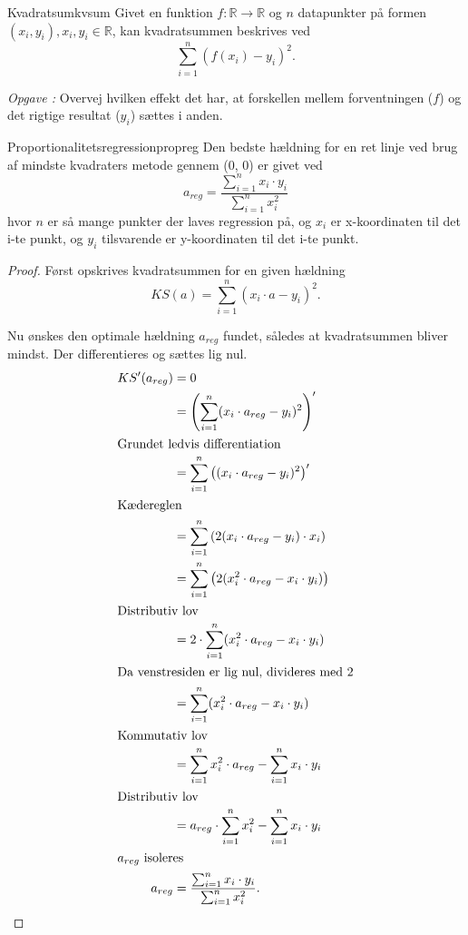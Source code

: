 \documentclass{article}
\newcounter{opgavecnt}
\newcommand{\opg}[1]{\stepcounter{opgavecnt}\textit{Opgave \arabic{opgavecnt}: }#1}
\begin{document}
\begin{definition}{Kvadratsum}{kvsum}
	Givet en funktion $f: \mathbb{R} \to \mathbb{R}$ og $n$ datapunkter på formen
	$(x_i, y_i), x_i, y_i \in \mathbb{R}$, kan kvadratsummen beskrives ved
	\[
		\sum_{i=1}^n (f(x_i) - y_i)^2.
	\] 
\end{definition}

\opg{Overvej hvilken effekt det har, at forskellen mellem forventningen ($f$)
og det rigtige resultat ($y_i$) sættes i anden.}

\begin{theorem}{Proportionalitetsregression}{propreg}
	Den bedste hældning for en ret linje ved brug af mindste kvadraters metode
	gennem (0, 0) er givet ved
	\[
	    a_{reg} = \frac{\sum_{i=1}^n x_i \cdot y_i}{\sum_{i=1}^n x_i^2}
	\] 
	hvor $n$ er så mange punkter der laves regression på, og $x_i$ er x-koordinaten
	til det i-te punkt, og $y_i$ tilsvarende er y-koordinaten til det i-te punkt.
\end{theorem}

\begin{proof}
Først opskrives kvadratsummen for en given hældning
\[
	KS(a) = \sum_{i=1}^n (x_i \cdot a - y_i)^2.
\] 

Nu ønskes den optimale hældning $a_{reg}$ fundet, således at kvadratsummen bliver
mindst. Der differentieres og sættes lig nul.
\begin{align*}
	KS'(a_{reg}) &= 0\\
				 &= \left(\sum_{i=1}^n (x_i \cdot a_{reg} - y_i)^2\right)'\\
\intertext{Grundet ledvis differentiation}
				 &= \sum_{i=1}^n \left((x_i \cdot a_{reg} - y_i)^2\right)'\\
				 \intertext{Kædereglen}
				 &= \sum_{i=1}^n \left(2(x_i \cdot a_{reg} - y_i) \cdot x_i\right)\\
				 &= \sum_{i=1}^n \left(2(x_i^2 \cdot a_{reg} - x_i \cdot y_i)\right)\\
				 \intertext{Distributiv lov}
				 &= 2 \cdot \sum_{i=1}^n (x_i^2 \cdot a_{reg} - x_i \cdot y_i)\\
				 \intertext{Da venstresiden er lig nul, divideres med 2}
				 &= \sum_{i=1}^n (x_i^2 \cdot a_{reg} - x_i \cdot y_i)\\
				 \intertext{Kommutativ lov}
				 &= \sum_{i=1}^n x_i^2 \cdot a_{reg} - \sum_{i=1}^n x_i \cdot y_i\\
				 \intertext{Distributiv lov}
				 &= a_{reg} \cdot \sum_{i=1}^n x_i^2 - \sum_{i=1}^n x_i \cdot y_i\\
				 \intertext{$a_{reg}$ isoleres}
	     a_{reg} &=  \frac{\sum_{i=1}^n x_i \cdot y_i}{\sum_{i=1}^n x_i^2}.\qedhere
\end{align*}
\end{proof}
\end{document}
